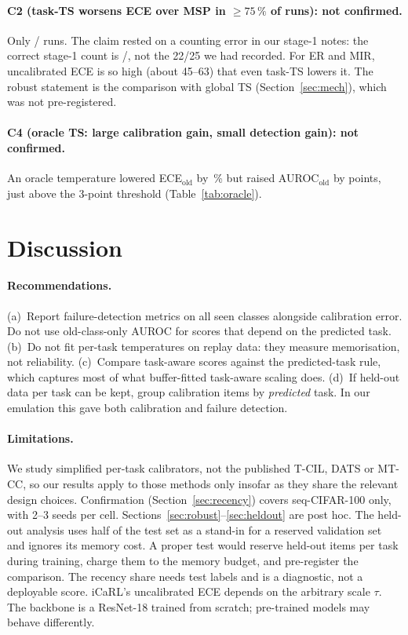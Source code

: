 \documentclass[11pt]{article}
\newcommand{\taskts}{task-TS}
\begin{document}
\paragraph{C2 (task-TS worsens ECE over MSP in $\geq 75\,\%$ of runs): not confirmed.} Only
\worseNoneConfirm/\nConfirm{} runs. The claim rested on a counting error in our stage-1 notes: the
correct stage-1 count is \worseNoneExplore/\nExplore, not the 22/25 we had recorded. For ER and MIR,
uncalibrated ECE is so high (about 45--63) that even \taskts{} lowers it. The robust statement is
the comparison with global TS (Section~\ref{sec:mech}), which was not pre-registered.

\paragraph{C4 (oracle TS: large calibration gain, small detection gain): not confirmed.} An oracle
temperature lowered ECE$_\mathrm{old}$ by \oracleEceRel\,\% but raised AUROC$_\mathrm{old}$ by
\oracleAurocGain{} points, just above the 3-point threshold (Table~\ref{tab:oracle}).



\section{Discussion}
\paragraph{Recommendations.} (a)~Report failure-detection metrics on all seen classes alongside
calibration error. Do not use old-class-only AUROC for scores that depend on the predicted task.
(b)~Do not fit per-task temperatures on replay data: they measure memorisation, not reliability.
(c)~Compare task-aware scores against the predicted-task rule, which captures most of what
buffer-fitted task-aware scaling does. (d)~If held-out data per task can be kept, group calibration
items by \emph{predicted} task. In our emulation this gave both calibration and failure detection.

\paragraph{Limitations.}\label{sec:limits} We study simplified per-task calibrators, not the published
T-CIL, DATS or MT-CC, so our results apply to those methods only insofar as they share the relevant
design choices. Confirmation (Section~\ref{sec:recency}) covers seq-CIFAR-100 only, with 2--3 seeds
per cell. Sections~\ref{sec:robust}--\ref{sec:heldout} are post hoc. The held-out analysis uses half
of the test set as a stand-in for a reserved validation set and ignores its memory cost. A proper
test would reserve held-out items per task during training, charge them to the memory budget, and
pre-register the comparison. The recency share needs test labels and is a diagnostic, not a
deployable score. iCaRL's uncalibrated ECE depends on the arbitrary scale $\tau$. The backbone is a
ResNet-18 trained from scratch; pre-trained models may behave differently.
\end{document}
